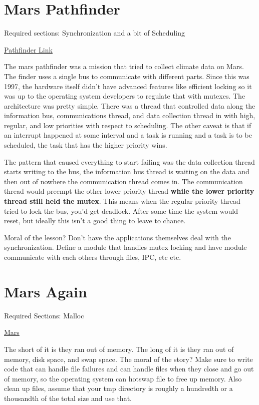 \section{Mars Pathfinder}

Required sections: Synchronization and a bit of Scheduling

\href{https://www.microsoft.com/en-us/research/people/mbj/#!just-for-fun}{Pathfinder Link}

The mars pathfinder was a mission that tried to collect climate data on Mars. The finder uses a single bus to communicate with different parts. Since this was 1997, the hardware itself didn't have advanced features like efficient locking so it was up to the operating system developers to regulate that with mutexes. The architecture was pretty simple. There was a thread that controlled data along the information bus, communications thread, and data collection thread in with high, regular, and low priorities with respect to scheduling. The other caveat is that if an interrupt happened at some interval and a task is running and a task is to be scheduled, the task that has the higher priority wins.

The pattern that caused everything to start failing was the data collection thread starts writing to the bus, the information bus thread is waiting on the data and then out of nowhere the communication thread comes in. The communication thread would preempt the other lower priority thread \textbf{while the lower priority thread still held the mutex}. This means when the regular priority thread tried to lock the bus, you'd get deadlock. After some time the system would reset, but ideally this isn't a good thing to leave to chance.

Moral of the lesson? Don't have the applications themselves deal with the synchronization. Define a module that handles mutex locking and have module communicate with each others through files, IPC, etc etc.

\section{Mars Again}

Required Sections: Malloc

\href{https://www.computerworld.com/article/2574759/data-storage-solutions/out-of-memory-problem-caused-mars-rover-s-glitch.html}{Mars}

The short of it is they ran out of memory. The long of it is they ran out of memory, disk space, and swap space. The moral of the story? Make sure to write code that can handle file failures and can handle files when they close and go out of memory, so the operating system can hotswap file to free up memory. Also clean up files, assume that your tmp directory is roughly a hundredth or a thousandth of the total size and use that.

